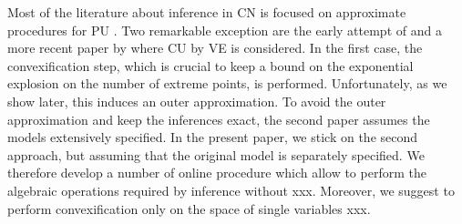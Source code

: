Most of the literature about inference in CN is focused on approximate procedures for PU \cite{xxx}. Two remarkable exception are the early attempt of \cite{rocha} and a more recent paper by \cite{maua} where CU by VE is considered. In the first case, the convexification step, which is crucial to keep a bound on the exponential explosion on the number of extreme points, is performed. Unfortunately, as we show later, this induces an outer approximation. To avoid the outer approximation and keep the inferences exact, the second paper assumes the models extensively specified. In the present paper, we stick on the second approach, but assuming that the original model is separately specified. We therefore develop a number of online procedure which allow to perform the algebraic operations required by inference without xxx. Moreover, we suggest to perform convexification only on the space of single variables xxx.
